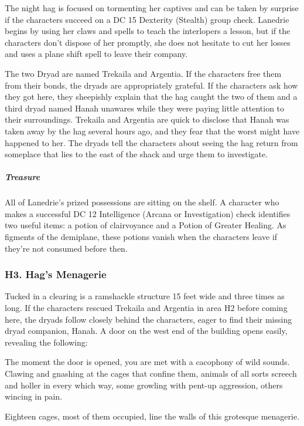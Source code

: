 \documentclass[10pt,a4paper,twoside,bg=print,twocolumn,openany,nodeprecatedcode]{dndbook}
\begin{document}
The night hag is focused on tormenting her captives and can be taken by surprise if the characters succeed on a DC 15 Dexterity (Stealth) group check. Lanedrie begins by using her claws and spells to teach the interlopers a lesson, but if the characters don't dispose of her promptly, she does not hesitate to cut her losses and uses a plane shift spell to leave their company.

The two Dryad are named Trekaila and Argentia. If the characters free them from their bonds, the dryads are appropriately grateful. If the characters ask how they got here, they sheepishly explain that the hag caught the two of them and a third dryad named Hanah unawares while they were paying little attention to their surroundings. Trekaila and Argentia are quick to disclose that Hanah was taken away by the hag several hours ago, and they fear that the worst might have happened to her. The dryads tell the characters about seeing the hag return from someplace that lies to the east of the shack and urge them to investigate.

\subparagraph{Treasure}
All of Lanedrie's prized possessions are sitting on the shelf. A character who makes a successful DC 12 Intelligence (Arcana or Investigation) check identifies two useful items: a potion of clairvoyance and a Potion of Greater Healing. As figments of the demiplane, these potions vanish when the characters leave if they're not consumed before then.

\subsubsection{H3. Hag's Menagerie}
Tucked in a clearing is a ramshackle structure 15 feet wide and three times as long. If the characters rescued Trekaila and Argentia in area H2 before coming here, the dryads follow closely behind the characters, eager to find their missing dryad companion, Hanah. A door on the west end of the building opens easily, revealing the following:

\begin{DndReadAloud}{}
The moment the door is opened, you are met with a cacophony of wild sounds. Clawing and gnashing at the cages that confine them, animals of all sorts screech and holler in every which way, some growling with pent-up aggression, others wincing in pain.

Eighteen cages, most of them occupied, line the walls of this grotesque menagerie.

\end{DndReadAloud}
\end{document}
